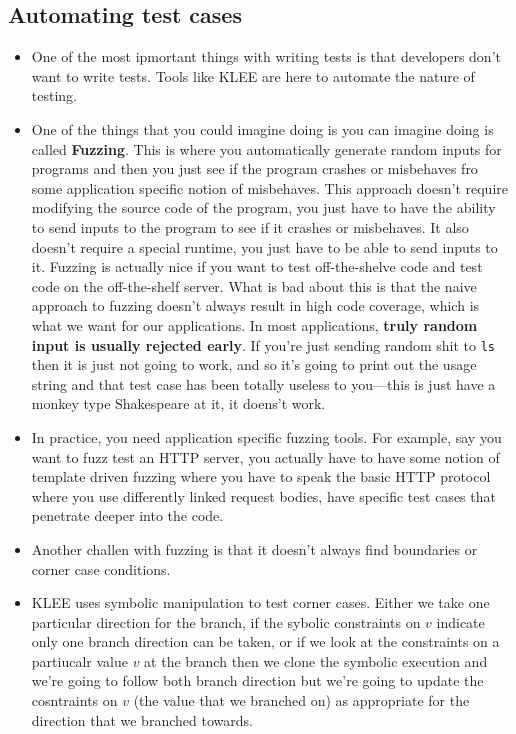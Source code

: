 \documentclass[12pt]{article}
\theoremstyle{definition}
\begin{document}
\subsection{Automating test cases}
\begin{itemize}
    \itemsep0em 
	\item  One of the most ipmortant things with writing tests is that developers don't want to write tests. Tools like KLEE are here to automate the nature of testing.
    \item One of the things that you could imagine doing is you can imagine doing is called \textbf{Fuzzing}. This is where you automatically generate random inputs for programs and then you just see if the program crashes or misbehaves fro some application specific notion of misbehaves. This approach doesn't require modifying the source code of the program, you just have to have the ability to send inputs to the program to see if it crashes or misbehaves. It also doesn't require a special runtime, you just have to be able to send inputs to it. Fuzzing is actually nice if you want to test off-the-shelve code and test code on the off-the-shelf server. What is bad about this is that the naive approach to fuzzing doesn't always result in high code coverage, which is what we want for our applications. In most applications, \textbf{truly random input is usually rejected early}. If you're just sending random shit to \texttt{ls} then it is just not going to work, and so it's going to print out the usage string and that test case has been totally useless to you---this is just have a monkey type Shakespeare at it, it doens't work.
    \item In practice, you need application specific fuzzing tools. For example, say you want to fuzz test an HTTP server, you actually have to have some notion of template driven fuzzing where you have to speak the basic HTTP protocol where you use differently linked request bodies, have specific test cases that penetrate deeper into the code.
    \item Another challen with fuzzing is that it doesn't always find boundaries or corner case conditions. 
    \item KLEE uses symbolic manipulation to test corner cases. Either we take one particular direction for the branch, if the sybolic constraints on $v$ indicate only one branch direction can be taken, or if we look at the constraints on a partiucalr value $v$ at the branch then we clone the symbolic execution and we're going to follow both branch direction but we're going to update the cosntraints on $v$ (the value that we branched on) as appropriate for the direction that we branched towards.

\end{itemize}
\end{document}
